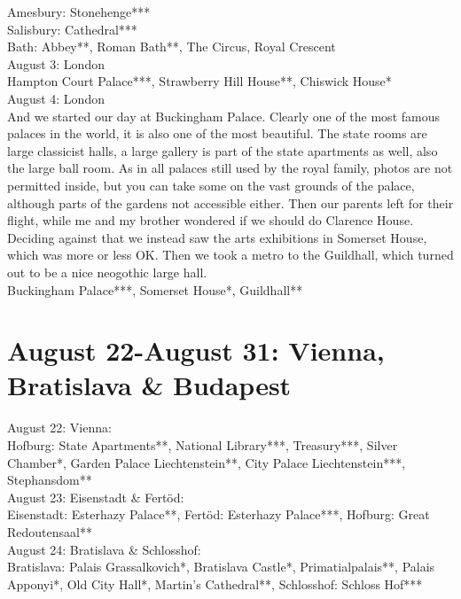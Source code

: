 Amesbury: Stonehenge***\\
Salisbury: Cathedral***\\
Bath: Abbey**, Roman Bath**, The Circus, Royal Crescent\\

August 3: London\\
Hampton Court Palace***, Strawberry Hill House**, Chiswick House*\\

August 4: London\\
And we started our day at Buckingham Palace. Clearly one of the most famous palaces in the world, it is also one of the most beautiful. The state rooms are large classicist halls, a large gallery is part of the state apartments as well, also the large ball room. As in all palaces still used by the royal family, photos are not permitted inside, but you can take some on the vast grounds of the palace, although parts of the gardens not accessible either. Then our parents left for their flight, while me and my brother wondered if we should do Clarence House. Deciding against that we instead saw the arts exhibitions in Somerset House, which was more or less OK. Then we took a metro to the Guildhall, which turned out to be a nice neogothic large hall.\\

Buckingham Palace***, Somerset House*, Guildhall**\\

\section{August 22-August 31: Vienna, Bratislava \& Budapest}
\label{austria2014}

August 22: Vienna:\\
Hofburg: State Apartments**, National Library***, Treasury***, Silver Chamber*, Garden Palace Liechtenstein**, City Palace Liechtenstein***, Stephansdom**\\

August 23: Eisenstadt \& Fert\"od:\\
Eisenstadt: Esterhazy Palace**, Fert\"od: Esterhazy Palace***, Hofburg: Great Redoutensaal**\\

August 24: Bratislava \& Schlosshof:\\
Bratislava: Palais Grassalkovich*, Bratislava Castle*, Primatialpalais**, Palais Apponyi*, Old City Hall*, Martin's Cathedral**, Schlosshof: Schloss Hof***\\

